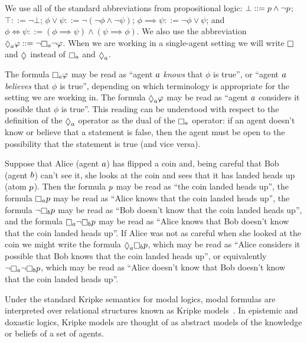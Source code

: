 We use all of the standard abbreviations from propositional logic:
$\bot ::= p \land \lnot p$;
$\top ::= \lnot \bot$;
$\phi \lor \psi ::= \lnot (\lnot \phi \land \lnot \psi)$;
$\phi \implies \psi ::= \lnot \phi \lor \psi$; and
$\phi \iff \psi ::= (\phi \implies \psi) \land (\psi \implies \phi)$.
We also use the abbreviation $\possibleA \phi ::= \lnot \necessaryA \lnot \phi$.
When we are working in a single-agent setting we will write $\necessary$ and $\possible$ instead of $\necessaryA$ and $\possibleA$.

The formula $\necessaryA \phi$ may be read as ``agent $a$ {\em knows} that $\phi$ is true'', or ``agent $a$ {\em believes} that $\phi$ is true'', depending on which terminology is appropriate for the setting we are working in.
The formula $\possibleA \phi$ may be read as ``agent $a$ considers it possible that $\phi$ is true''.
This reading can be understood with respect to the definition of the $\possibleA$ operator as the dual of the $\necessaryA$ operator: if an agent doesn't know or believe that a statement is false, then the agent must be open to the possibility that the statement is true (and vice versa).

\begin{example}\label{example-ml-formula}
Suppose that Alice (agent $a$) has flipped a coin and, being careful that Bob (agent $b$) can't see it, she looks at the coin and sees that it has landed heads up (atom $p$).
Then the formula $p$ may be read as ``the coin landed heads up'',
the formula $\knowsA \atomP$ may be read as ``Alice knows that the coin landed heads up'',
the formula $\lnot \knowsB \atomP$ may be read as ``Bob doesn't know that the coin landed heads up'',
and the formula $\knowsA \lnot \knowsB \atomP$ may be read as ``Alice knows that Bob doesn't know that the coin landed heads up''.
If Alice was not as careful when she looked at the coin we might write the formula $\possibleA \knowsB \atomP$, which may be read as ``Alice considers it possible that Bob knows that the coin landed heads up'', 
or equivalently $\lnot \knowsA \lnot \knowsB \atomP$, which may be read as ``Alice doesn't know that Bob doesn't know that the coin landed heads up''.
\end{example}

Under the standard Kripke semantics for modal logics, modal formulas are interpreted over relational structures known as Kripke models~\cite{tarski:1941,kripke:1959,hintikka:1962}.
In epistemic and doxastic logics, Kripke models are thought of as abstract models of the knowledge or beliefs of a set of agents.

